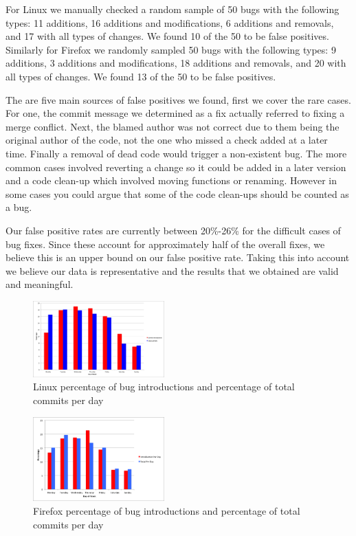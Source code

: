 For Linux we manually checked a random sample of 50 bugs with the
following types: 11 additions, 16 additions and modifications, 6 additions
and removals, and 17 with all types of changes. We found 10 of the 50
to be false positives. Similarly for Firefox we randomly sampled 50
bugs with the following types: 9 additions, 3 additions and
modifications, 18 additions and removals, and 20 with all types of
changes. We found 13 of the 50 to be false positives.

The are five main sources of false positives we found, first we cover
the rare cases. For one, the commit message we determined as a fix
actually referred to fixing a merge conflict. Next, the blamed author
was not correct due to them being the original author of the code, not
the one who missed a check added at a later time. Finally a removal of
dead code would trigger a non-existent bug. The more common cases
involved reverting a change so it could be added in a later version
and a code clean-up which involved moving functions or
renaming. However in some cases you could argue that some of the code
clean-ups should be counted as a bug.

Our false positive rates are currently between 20\%-26\% for the
difficult cases of bug fixes. Since these account for approximately
half of the overall fixes, we believe this is an upper bound on our
false positive rate. Taking this into account we believe our data is
representative and the results that we obtained are valid and meaningful.

\begin{figure}
\begin{center}
\includegraphics[width=0.45\textwidth]{linux_bug_introduction_day_of_week.png}
\end{center}
\caption{Linux percentage of bug introductions and percentage of total commits per day}
\label{fig-linux-weekday}
\end{figure}

\begin{figure}
\begin{center}
\includegraphics[width=0.45\textwidth]{firefox_bug_introduction_day_of_week.png}
\end{center}
\caption{Firefox percentage of bug introductions and percentage of total commits per day}
\label{fig-firefox-weekday}
\end{figure}


